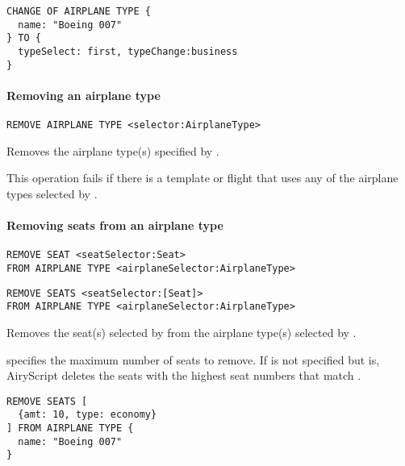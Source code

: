 \begin{texa}
  {
  \begin{lstlisting}
CHANGE OF AIRPLANE TYPE {
  name: "Boeing 007"
} TO {
  typeSelect: first, typeChange:business
}
  \end{lstlisting}
  }
\end{texa}
\paragraph{Removing an airplane type}
\begin{operation}
  \lstinline|REMOVE AIRPLANE TYPE <selector:AirplaneType>|
\end{operation}
Removes the airplane type(s) specified by . 

This operation fails if there is a template or flight that uses any of the
airplane types selected by .

\paragraph{Removing seats from an airplane type}
\begin{operation}
  \begin{lstlisting}
REMOVE SEAT <seatSelector:Seat>
FROM AIRPLANE TYPE <airplaneSelector:AirplaneType>
  \end{lstlisting}
\end{operation}
\begin{operation}
  \begin{lstlisting}
REMOVE SEATS <seatSelector:[Seat]>
FROM AIRPLANE TYPE <airplaneSelector:AirplaneType>
  \end{lstlisting}
\end{operation}
Removes the seat(s) selected by  from the airplane type(s)
selected by .

 specifies the maximum number of seats to remove. If  is
not specified but  is, AiryScript deletes the seats with the highest
seat numbers that match .

\begin{texa}
  {
  \begin{lstlisting}
REMOVE SEATS [
  {amt: 10, type: economy}
] FROM AIRPLANE TYPE {
  name: "Boeing 007"
}
\end{lstlisting}
  }
\end{texa}

